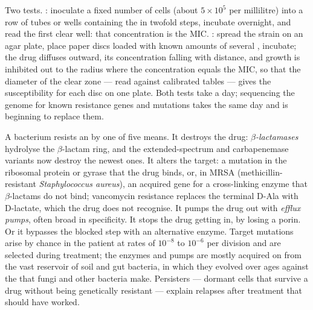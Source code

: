 \begin{method}\label{met:b3:bacteriology:mic}
Two tests. \emph{}: inoculate a fixed number of cells
(about $5\times 10^{5}$ per millilitre) into a row of tubes or wells
containing the  in twofold steps, incubate overnight, and
read the first clear well: that concentration is the MIC. \emph{}: spread the strain on an agar plate, place paper discs
loaded with known amounts of several , incubate; the drug
diffuses outward, its concentration falling with distance, and growth
is inhibited out to the radius where the concentration equals the MIC,
so that the diameter of the clear zone --- read against calibrated
tables --- gives the susceptibility for each disc on one plate. Both
tests take a day; sequencing the genome for known resistance genes and
mutations takes the same day and is beginning to replace them.
\end{method}

\begin{definition}[Resistance]\label{def:b3:bacteriology:resistance}
A bacterium resists an  by one of five means. It destroys the
drug: \emph{$\beta$-lactamases} hydrolyse the $\beta$-lactam ring, and
the extended-spectrum and carbapenemase variants now destroy the
newest ones. It alters the target: a mutation in the ribosomal protein
or gyrase that the drug binds, or, in MRSA (methicillin-resistant
\emph{Staphylococcus aureus}), an acquired gene for a cross-linking
enzyme that $\beta$-lactams do not bind; vancomycin resistance replaces
the terminal D-Ala with D-lactate, which the drug does not recognise.
It pumps the drug out with \emph{efflux pumps}, often broad in
specificity. It stops the drug getting in, by losing a porin. Or it
bypasses the blocked step with an alternative enzyme. Target mutations
arise by chance in the patient at rates of $10^{-8}$ to $10^{-6}$ per
division and are selected during treatment; the enzymes and pumps are
mostly acquired on  from the vast reservoir of soil and gut
bacteria, in which they evolved over ages against the  that
fungi and other bacteria make. Persisters --- dormant cells that
survive a drug without being genetically resistant --- explain relapses
after treatment that should have worked.
\end{definition}

